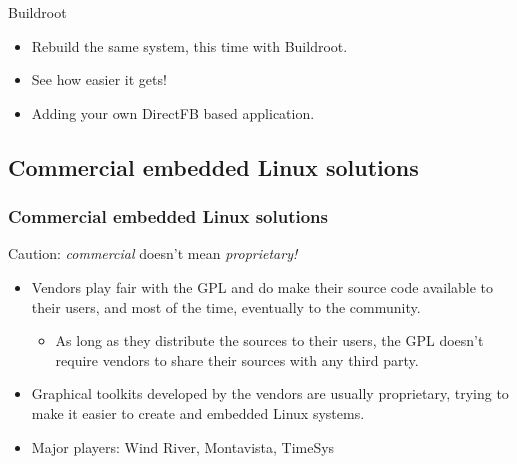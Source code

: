 \setuplabframe
{Buildroot}
{
  \begin{itemize}
  \item Rebuild the same system, this time with Buildroot.
  \item See how easier it gets!
  \item Adding your own DirectFB based application.
  \end{itemize}
}

\subsection{Commercial embedded Linux solutions}

\begin{frame}
  \frametitle{Commercial embedded Linux solutions}
  Caution: {\em commercial} doesn't mean {\em proprietary!}
  \begin{itemize}
  \item Vendors play fair with the GPL and do make their source code
    available to their users, and most of the time, eventually to the
    community.
    \begin{itemize}
    \item As long as they distribute the sources to their users, the
      GPL doesn't require vendors to share their sources with any
      third party.
    \end{itemize}
  \item Graphical toolkits developed by the vendors are usually
    proprietary, trying to make it easier to create and embedded Linux
    systems.
  \item Major players: Wind River, Montavista, TimeSys
  \end{itemize}
\end{frame}

